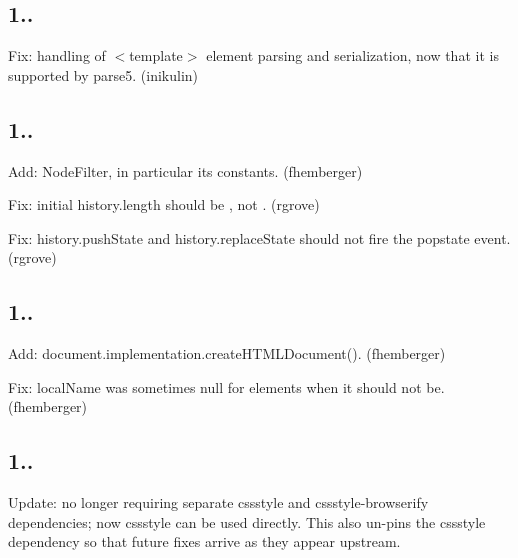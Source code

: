\subsection*{1..}


\begin{DoxyItemize}
\item Fix\+: handling of {\ttfamily $<$template$>$} element parsing and serialization, now that it is supported by parse5. (inikulin)
\end{DoxyItemize}

\subsection*{1..}


\begin{DoxyItemize}
\item Add\+: {\ttfamily Node\+Filter}, in particular its constants. (fhemberger)
\item Fix\+: initial {\ttfamily history.\+length} should be {}, not {}. (rgrove)
\item Fix\+: {\ttfamily history.\+push\+State} and {\ttfamily history.\+replace\+State} should not fire the {\ttfamily popstate} event. (rgrove)
\end{DoxyItemize}

\subsection*{1..}


\begin{DoxyItemize}
\item Add\+: {\ttfamily document.\+implementation.\+create\+H\+T\+M\+L\+Document()}. (fhemberger)
\item Fix\+: {\ttfamily local\+Name} was sometimes {\ttfamily null} for elements when it should not be. (fhemberger)
\end{DoxyItemize}

\subsection*{1..}


\begin{DoxyItemize}
\item Update\+: no longer requiring separate {\ttfamily cssstyle} and {\ttfamily cssstyle-\/browserify} dependencies; now {\ttfamily cssstyle} can be used directly. This also un-\/pins the {\ttfamily cssstyle} dependency so that future fixes arrive as they appear upstream.
\end{DoxyItemize}

